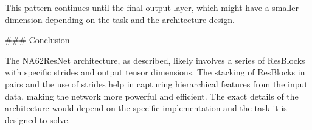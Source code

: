 This pattern continues until the final output layer, which might have a smaller dimension depending on the task and the architecture design.

### Conclusion

The NA62ResNet architecture, as described, likely involves a series of ResBlocks with specific strides and output tensor dimensions. The stacking of ResBlocks in pairs and the use of strides help in capturing hierarchical features from the input data, making the network more powerful and efficient. The exact details of the architecture would depend on the specific implementation and the task it is designed to solve.